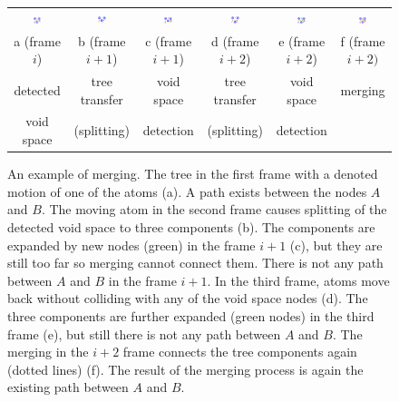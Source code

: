 \documentclass[usletter, 10pt, conference]{svjour3}      %
\begin{document}
\begin{figure}
\centering
{
\renewcommand{\tabcolsep}{1pt}
\begin{tabular}{cccccc}
\includegraphics[width=0.15\textwidth]{fig/merging1} &
\includegraphics[width=0.15\textwidth]{fig/merging2} &
\includegraphics[width=0.15\textwidth]{fig/merging3} &
\includegraphics[width=0.15\textwidth]{fig/merging4} &
\includegraphics[width=0.15\textwidth]{fig/merging5} &
\includegraphics[width=0.15\textwidth]{fig/merging6}  \\
a (frame $i$) & b (frame $i+1$) & c (frame $i+1$) & d (frame $i+2$)  & e (frame $i+2$) & f (frame $i+2)$ \\
detected      & tree transfer   & void space      & tree transfer    & void space      & merging   \\
void space    & (splitting)      & detection       &  (splitting)     &  detection      & \\              
\end{tabular}
\caption{\label{fig::merging}
An example of merging.
The tree in the first frame with a denoted motion of one of the atoms (a). 
A path exists between the nodes $A$ and $B$.
The moving atom in the second frame causes splitting of the detected void space to three components (b).
The components are expanded by new nodes (green) in the frame $i+1$ (c), but they are still too far so merging cannot connect them.
There is not any path between $A$ and $B$ in the frame $i+1$. 
In the third frame, atoms move back without colliding with any of the void space nodes (d).
The three components are further expanded (green nodes) in the third frame (e), but still there is not any path between $A$ and $B$.
The merging in the $i+2$ frame connects the tree components again (dotted lines) (f).
The result of the merging process is again the existing path between $A$ and $B$.
}
}
\end{figure}
\end{document}

